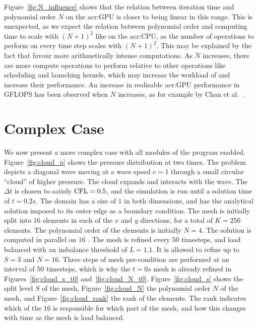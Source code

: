 Figure~\ref{fig:N_influence} shows that the relation between iteration time and polynomial order
\(N\) on the \acrshort{acr:GPU} is closer to being linear in this range. This is unexpected, as we
expect the relation between polynomial order and computing time to scale with \({\left( N + 1
        \right)}^2\) like on the \acrshort{acr:CPU}, as the number of operations to perform on every time
step scales with \({\left( N + 1 \right)}^2\). This may be explained by the fact that
 favour more arithmetically intense computations. As \(N\) increases, there are
more compute operations to perform relative to other operations like scheduling and launching
kernels, which may increase the workload of  and increase their performance. An
increase in realisable \acrshort{acr:GPU} performance in GFLOPS has been observed when \(N\)
increases, as for example by Chan et al.~\cite{Chan2016}.

\section{Complex Case}\label{section:results:complex_application}

We now present a more complex case with all modules of the program enabled. Figure~\ref{fig:cloud_p}
shows the pressure distribution at two times. The problem depicts a diagonal wave moving at a wave
speed \(c = 1\) through a small circular ``cloud'' of higher pressure. The cloud expands and
interacts with the wave. The \(\Delta t\) is chosen to satisfy \(\operatorname{CFL} = 0.5\), and the simulation is
run until a solution time of \(t = 0.2 s\). The domain has a size of \(1\) in both dimensions, and
has the analytical solution imposed to its outer edge as a boundary condition. The mesh is initially
split into \(16\) elements in each of the \(x\) and \(y\) directions, for a total of \(K = 256\)
elements. The polynomial order of the elements is initially \(N = 4\). The solution is computed in
parallel on \(16\) . The mesh is refined every \(50\) timesteps, and load
balanced with an imbalance threshold of \(L = 1.1\). It is allowed to refine up to \(S = 3\) and \(N
= 16\). Three steps of mesh pre-condition are performed at an interval of \(50\) timesteps, which is
why the \(t = 0 s\) mesh is already refined in Figures~\ref{fig:cloud_s_t0}
and~\ref{fig:cloud_N_t0}. Figure~\ref{fig:cloud_s} shows the split level \(S\) of the mesh,
Figure~\ref{fig:cloud_N} the polynomial order \(N\) of the mesh, and Figure~\ref{fig:cloud_rank} the
rank of the elements. The rank indicates which of the \(16\)  is responsible for
which part of the mesh, and how this changes with time as the mesh is load balanced.


